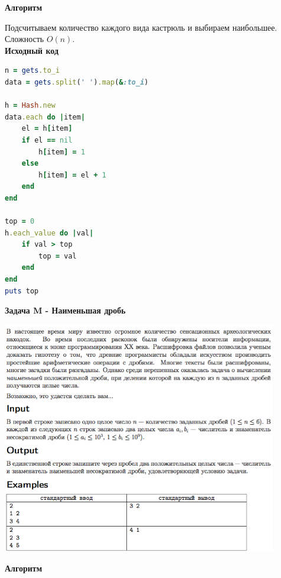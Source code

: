 \documentclass[a4paper,12pt]{article}
\begin{document}
\textbf{{\large Алгоритм}}

Подсчитываем количество каждого вида кастрюль и выбираем наибольшее. Сложность $O(n)$. \\

\textbf{{\large Исходный код}} \\
\begin{lstlisting}[language=Ruby]
n = gets.to_i
data = gets.split(' ').map(&:to_i)

h = Hash.new
data.each do |item|
    el = h[item]
    if el == nil
        h[item] = 1
    else
        h[item] = el + 1
    end
end

top = 0
h.each_value do |val|
    if val > top
        top = val
    end
end
puts top
\end{lstlisting}


\newpage
\textbf{{\large Задача M - Наименьшая дробь}}

\begin{center}
\includegraphics[width=0.9\textwidth]{OC_Tatarstan_2016/M.png}\\ [1cm]
\end{center}

\textbf{{\large Алгоритм}}
\end{document}
